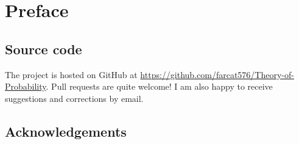 \chapter{Preface}


\section*{Source code}
The project is hosted on GitHub at
\url{https://github.com/farcat576/Theory-of-Probability}.
Pull requests are quite welcome!
I am also happy to receive suggestions and corrections by email.

\section*{Acknowledgements}
